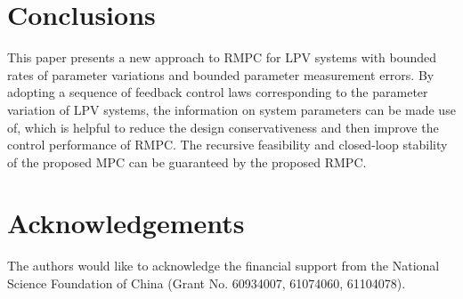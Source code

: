 \documentclass{singlecol-new}
\theoremstyle{TH}{
\newtheorem{lemma}{Lemma}
\newtheorem{theorem}[lemma]{Theorem}
\newtheorem{corrolary}[lemma]{Corrolary}
\newtheorem{conjecture}[lemma]{Conjecture}
\newtheorem{proposition}[lemma]{Proposition}
\newtheorem{claim}[lemma]{Claim}
\newtheorem{stheorem}[lemma]{Wrong Theorem}
\newtheorem{algorithm}{Algorithm}
}
\theoremstyle{THrm}{
\newtheorem{definition}{Definition}[section]
\newtheorem{question}{Question}[section]
\newtheorem{remark}{Remark}
\newtheorem{scheme}{Scheme}
}
\theoremstyle{THhit}{
\newtheorem{case}{Case}[section]
}
\begin{document}
\section{Conclusions}

This paper presents a new approach to RMPC for LPV systems with
bounded rates of parameter variations and bounded parameter
measurement errors. By adopting a sequence of feedback control laws
corresponding to the parameter variation of LPV systems, the
information on system parameters can be made use of, which is
helpful to reduce the design conservativeness and then improve the
control performance of RMPC. The recursive feasibility and
closed-loop stability of the proposed MPC can be guaranteed by the
proposed RMPC.

\section*{Acknowledgements}
The authors would like to acknowledge the financial support from the
National Science Foundation of China (Grant No. 60934007, 61074060,
61104078).
\end{document}
